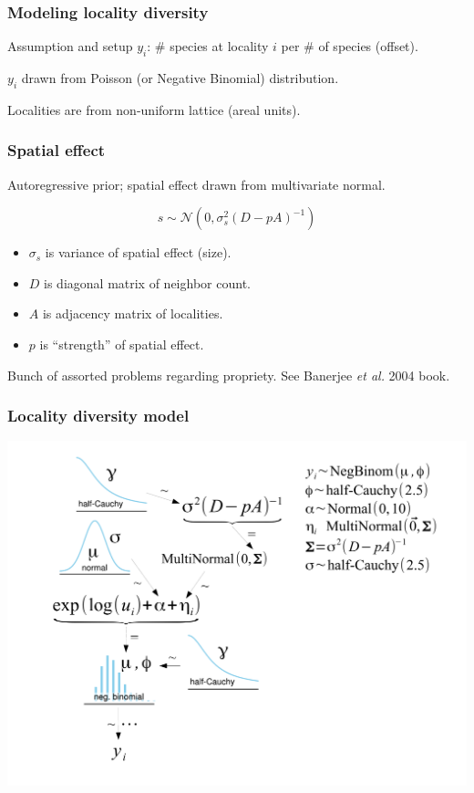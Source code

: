 \documentclass{beamer}
\begin{document}
\begin{frame}
  \frametitle{Modeling locality diversity}
  \begin{alertblock}{Assumption and setup}
    \(y_{i}\): \# species at locality \(i\) per \# of species (offset).

    \(y_{i}\) drawn from Poisson (or Negative Binomial) distribution.

    Localities are from non-uniform lattice (areal units).
  \end{alertblock}
\end{frame}

\begin{frame}
  \frametitle{Spatial effect}

  \begin{definition}
    Autoregressive prior; spatial effect drawn from multivariate normal.

    \begin{equation*}
      s \sim \mathcal{N}(0, \sigma_{s}^{2}(D - pA)^{-1})
    \end{equation*}

    \begin{itemize}
      \item \(\sigma_{s}\) is variance of spatial effect (size).
      \item \(D\) is diagonal matrix of neighbor count.
      \item \(A\) is adjacency matrix of localities.
      \item \(p\) is ``strength'' of spatial effect.
    \end{itemize}

    \tiny{Bunch of assorted problems regarding propriety. See Banerjee \textit{et al.} 2004 book.}

  \end{definition}
\end{frame}

\begin{frame}
  \frametitle{Locality diversity model}
  \begin{center}
    \includegraphics[height = 0.8\textheight, width = \textwidth,  keepaspectratio = true]{figure/mammal_locality_model}
  \end{center}
\end{frame}
\end{document}
